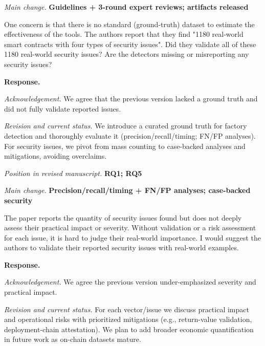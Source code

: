 \documentclass[acmsmall]{acmart}
\begin{document}
	\textit{Main change.}
	{\color{blue}\textbf{Guidelines + 3-round expert reviews; artifacts released}}

	\begin{tcolorbox}
		[commentbox,title=Reviewer \#4 -- Comment 2] One concern is that there is no standard (ground-truth)
		dataset to estimate the effectiveness of the tools. The authors report that they find "1180 real-world
		smart contracts with four types of security issues". Did they validate all of these 1180 real-world
		security issues? Are the detectors missing or misreporting any security issues?
	\end{tcolorbox}

	\noindent
	\textbf{Response.}

	\textit{Acknowledgement.} We agree that the previous version lacked a ground truth and did not fully
	validate reported issues.

	\textit{Revision and current status.} We introduce a curated ground truth for factory detection
	and thoroughly evaluate it (precision/recall/timing; FN/FP analyses). For security issues, we pivot
	from mass counting to case-backed analyses and mitigations, avoiding overclaims.

	\textit{Position in revised manuscript.} {\color{red}\textbf{RQ1; RQ5}}

	\textit{Main change.} {\color{blue}\textbf{Precision/recall/timing + FN/FP analyses; case-backed security}}

	\begin{tcolorbox}
		[commentbox,title=Reviewer \#4 -- Comment 3] The paper reports the quantity of security issues
		found but does not deeply assess their practical impact or severity. Without validation or a
		risk assessment for each issue, it is hard to judge their real-world importance. I would
		suggest the authors to validate their reported security issues with real-world examples.
	\end{tcolorbox}

	\noindent
	\textbf{Response.}

	\textit{Acknowledgement.} We agree the previous version under-emphasized severity and practical
	impact.

	\textit{Revision and current status.} For each vector/issue we discuss practical impact and operational
	risks with prioritized mitigations (e.g., return-value validation, deployment-chain attestation).
	We plan to add broader economic quantification in future work as on-chain datasets mature.
\end{document}
